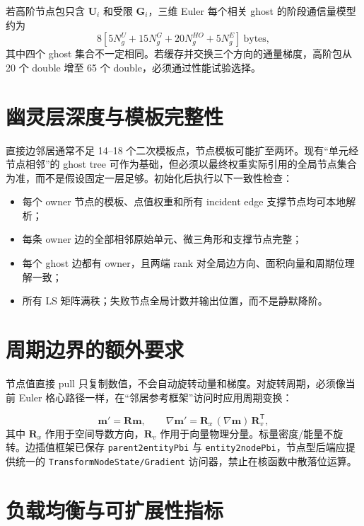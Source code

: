 \documentclass[UTF8,a4paper,11pt,openany]{ctexrep}
\numberwithin{equation}{chapter}
\newcommand{\grad}{\nabla}
\newcommand{\transpose}{\mathsf T}
\newcommand{\pathcode}[1]{\nolinkurl{#1}}
\begin{document}
若高阶节点包只含 $\bm U_i$ 和受限 $\bm G_i$，三维 Euler 每个相关 ghost 的阶段通信量模型约为
\begin{equation}
  8\left[5N_g^{U}+15N_g^{G}+20N_g^{HO}+5N_g^{E}\right]\ \text{bytes},
\end{equation}
其中四个 ghost 集合不一定相同。若缓存并交换三个方向的通量梯度，高阶包从 20 个 double 增至 65 个 double，必须通过性能试验选择。

\section{幽灵层深度与模板完整性}

直接边邻居通常不足 14--18 个二次模板点，节点模板可能扩至两环。现有“单元经节点相邻”的 ghost tree 可作为基础，但必须以最终权重实际引用的全局节点集合为准，而不是假设固定一层足够。初始化后执行以下一致性检查：

\begin{itemize}
  \item 每个 owner 节点的模板、点值权重和所有 incident edge 支撑节点均可本地解析；
  \item 每条 owner 边的全部相邻原始单元、微三角形和支撑节点完整；
  \item 每个 ghost 边都有 owner，且两端 rank 对全局边方向、面积向量和周期位理解一致；
  \item 所有 LS 矩阵满秩；失败节点全局计数并输出位置，而不是静默降阶。
\end{itemize}

\section{周期边界的额外要求}

节点值直接 pull 只复制数值，不会自动旋转动量和梯度。对旋转周期，必须像当前 Euler 格心路径一样，在“邻居参考框架”访问时应用周期变换：

\begin{equation}
  \bm m' =\bm R\bm m,
  \qquad
  \grad\bm m'=\bm R_x\,(\grad\bm m)\,\bm R_v^{\transpose},
\end{equation}
其中 $\bm R_x$ 作用于空间导数方向，$\bm R_v$ 作用于向量物理分量。标量密度/能量不旋转。边插值框架已保存 \pathcode{parent2entityPbi} 与 \pathcode{entity2nodePbi}，节点型后端应提供统一的 \pathcode{TransformNodeState/Gradient} 访问器，禁止在核函数中散落位运算。

\section{负载均衡与可扩展性指标}
\end{document}
